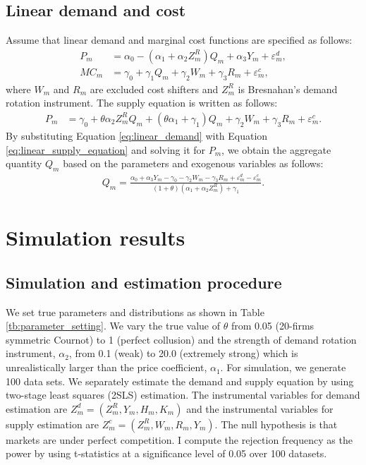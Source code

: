 \documentclass[11pt, a4paper]{article}
\begin{document}
\subsection{Linear demand and cost}
Assume that linear demand and marginal cost functions are specified as follows:
\begin{align}
    P_m &= \alpha_0 - (\alpha_1 + \alpha_2Z^{R}_{m})Q_{m} + \alpha_3 Y_m + \varepsilon^{d}_{m},\label{eq:linear_demand}\\
    MC_m &= \gamma_0  + \gamma_1 Q_{m} + \gamma_2 W_{m} + \gamma_3 R_{m} + \varepsilon^{c}_{m},\label{eq:linear_marginal_cost}
\end{align}
where $W_{m}$ and $R_{m}$ are excluded cost shifters and $Z^{R}_{m}$ is Bresnahan's demand rotation instrument. 
The supply equation is written as follows:
\begin{align}
    P_m 
    &= \gamma_0 + \theta \alpha_2 Z^{R}_mQ_{m} + (\theta\alpha_1 + \gamma_1) Q_{m} + \gamma_2 W_m + \gamma_3 R_{m} +\varepsilon^c_m.\label{eq:linear_supply_equation}
\end{align}
By substituting Equation \eqref{eq:linear_demand} with Equation \eqref{eq:linear_supply_equation} and solving it for $P_m$, we obtain the aggregate quantity $Q_{m}$ based on the parameters and exogenous variables as follows:
\begin{align}
    Q_{m} =  \frac{\alpha_0 + \alpha_3 Y_m - \gamma_0 - \gamma_2 W_{m} - \gamma_3 R_{m} + \varepsilon^{d}_{m} - \varepsilon^{c}_{m}}{(1 + \theta) (\alpha_1 + \alpha_2 Z^{R}_{m}) + \gamma_1}.\label{eq:quantity_linear}
\end{align}


\section{Simulation results}\label{sec:results}

\subsection{Simulation and estimation procedure}

We set true parameters and distributions as shown in Table \ref{tb:parameter_setting}. 
We vary the true value of $\theta$ from 0.05 (20-firms symmetric Cournot) to 1 (perfect collusion) and the strength of demand rotation instrument, $\alpha_2$, from 0.1 (weak) to 20.0 (extremely strong) which is unrealistically larger than the price coefficient, $\alpha_1$.
For simulation, we generate 100 data sets.
We separately estimate the demand and supply equation by using two-stage least squares (2SLS) estimation.
The instrumental variables for demand estimation are $Z^{d}_{m} = (Z^{R}_{m}, Y_m, H_{m}, K_{m})$ and the instrumental variables for supply estimation are $Z^{c}_{m} = (Z^{R}_{m}, W_{m}, R_{m}, Y_m)$. 
The null hypothesis is that markets are under perfect competition.
I compute the rejection
frequency as the power by using t-statistics at a significance level of 0.05 over 100 datasets.
\end{document}
